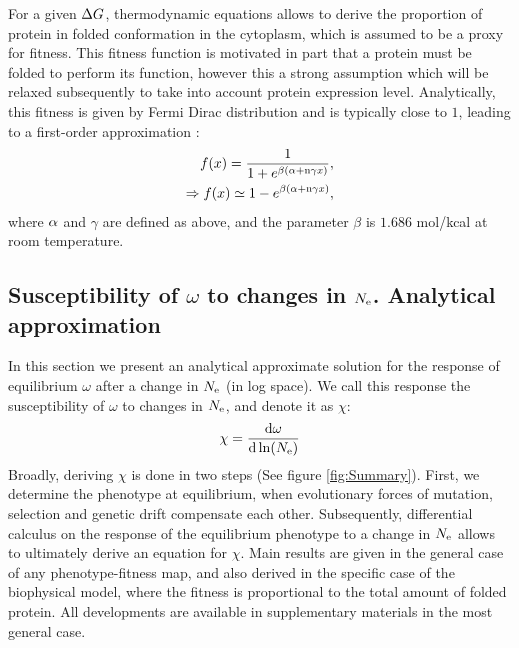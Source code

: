 For a given $\Delta G$, thermodynamic equations allows to derive the proportion of protein in folded conformation in the cytoplasm, which is assumed to be a proxy for fitness.
This fitness function is motivated in part that a protein must be folded to perform its function, however this a strong assumption which will be relaxed subsequently to take into account protein expression level.
Analytically, this fitness is given by Fermi Dirac distribution and is typically close to $1$, leading to a first-order approximation \citep{Goldstein2011}: 
\begin{align}
 f(x) = \dfrac{1}{1 + e^{\beta (\alpha + \text{n} \gamma x)}},\\
 \Rightarrow f(x) \simeq 1 - e^{\beta (\alpha + \text{n} \gamma x)}, 
\end{align}
where $\alpha$ and $\gamma$ are defined as above, and the parameter $\beta$ is $1.686$ mol/kcal at room temperature.

\subsection{Susceptibility of \texorpdfstring{$\omega$}{ω} to changes in \texorpdfstring{$N_{\mathrm{e}}$}{Nₑ}. Analytical approximation}

In this section we present an analytical approximate solution for the response of equilibrium $\omega$ after a change in $N_{\mathrm{e}}$ (in log space). We call this response the susceptibility of $\omega$ to changes in $N_{\mathrm{e}}$, and denote it as $\chi$:
\begin{align}
 \chi = \frac{ \der \omega}{\der \ln (\Ne)} \label{eq:chi}
\end{align}
Broadly, deriving $\chi$ is done in two steps (See figure \ref{fig:Summary}).
First, we determine the phenotype at equilibrium, when evolutionary forces of mutation, selection and genetic drift compensate each other.
Subsequently, differential calculus on the response of the equilibrium phenotype to a change in $N_{\mathrm{e}}$ allows to ultimately derive an equation for $\chi$.
Main results are given in the general case of any phenotype-fitness map, and also derived in the specific case of the biophysical model, where the fitness is proportional to the total amount of folded protein.
All developments are available in supplementary materials in the most general case.

